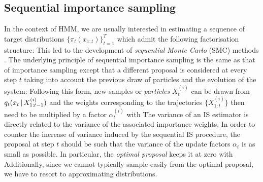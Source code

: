 \subsection{Sequential importance sampling}
In the context of HMM, we are usually interested in estimating a sequence of target distributions $\{\pi_{t}(x_{1:t})\}_{t=1}^{T}$ which admit the following factorisation structure:
%
%
This led to the development of \emph{sequential Monte Carlo} (SMC) methods \citep[chapter 14.3]{robert04}. The underlying principle of sequential importance sampling is the same as that of importance sampling except that a different proposal is considered at every step $t$ taking into account the previous draw of particles and the evolution of the system:
%
%
Following this form, new samples or \emph{particles} $X^{(i)}_t$ can be drawn from $q_{t}(x_{t}\,|\, X^{(i)}_{1:t-1})$ and the weights corresponding to the trajectories $\{X^{(i)}_{1:t}\}$ then need to be multiplied by a factor $\alpha^{(i)}_{t}$ with
%
%
The variance of an IS estimator is directly related to the variance of the associated importance weights. In order to counter the increase of variance induced by the sequential IS procedure, the proposal at step $t$ should be such that the variance of the update factors $\alpha_t$ is as small as possible. In particular, the \emph{optimal proposal} \citep{doucet11} keeps it at zero with
Additionally, since we cannot typically sample easily from the optimal proposal, we have to resort to approximating distributions.

